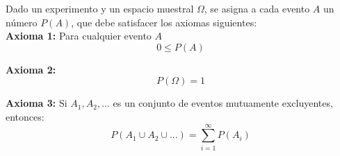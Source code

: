 \noindent Dado un experimento y un espacio muestral $\Omega$, se asigna a cada evento $A$ un número $P(A)$, que debe satisfacer los axiomas siguientes: \\

\noindent\textbf{Axioma 1:} Para cualquier evento $A$
\begin{equation*}
    0 \leq P(A)
\end{equation*}

\noindent\textbf{Axioma 2:} 
\begin{equation*}
    P(\Omega) = 1
\end{equation*}

\noindent\textbf{Axioma 3:} Si $A_{1}, A_{2}, ...$ es un conjunto de eventos mutuamente excluyentes, entonces:
\begin{equation*}
    P(A_{1} \cup A_{2} \cup ...) = \sum_{i = 1}^{\infty} P(A_{i})
\end{equation*}


